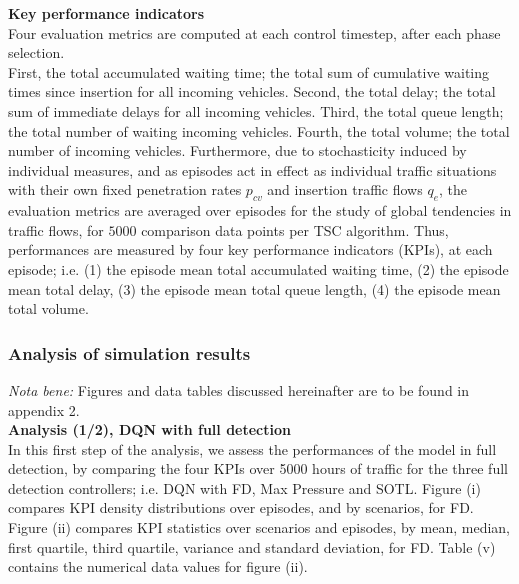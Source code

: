 \textbf{Key performance indicators} \\
Four evaluation metrics are computed at each control timestep, after each phase selection. \\
First, the total accumulated waiting time; the total sum of cumulative waiting times since insertion for all incoming vehicles. Second, the total delay; the total sum of immediate delays for all incoming vehicles. Third, the total queue length; the total number of waiting incoming vehicles. Fourth, the total volume; the total number of incoming vehicles. 
Furthermore, due to stochasticity induced by individual measures, and as episodes act in effect as individual traffic situations with their own fixed penetration rates $p_{cv}$ and insertion traffic flows $q_e$, the evaluation metrics are averaged over episodes for the study of global tendencies in traffic flows, for $5000$ comparison data points per TSC algorithm. Thus, performances are measured by four key performance indicators (KPIs), at each episode; i.e. (1) the episode mean total accumulated waiting time, (2) the episode mean total delay, (3) the episode mean total queue length, (4) the episode mean total volume. 

\subsubsection{Analysis of simulation results}

\textit{Nota bene:} Figures and data tables discussed hereinafter are to be found in appendix 2. \\

\textbf{Analysis (1/2), DQN with full detection} \\
In this first step of the analysis, we assess the performances of the model in full detection, by comparing the four KPIs over 5000 hours of traffic for the three full detection controllers; i.e. DQN with FD, Max Pressure and SOTL. Figure (i) compares KPI density distributions over episodes, and by scenarios, for FD. Figure (ii) compares KPI statistics over scenarios and episodes, by mean, median, first quartile, third quartile, variance and standard deviation, for FD. Table (v) contains the numerical data values for figure (ii). \\

